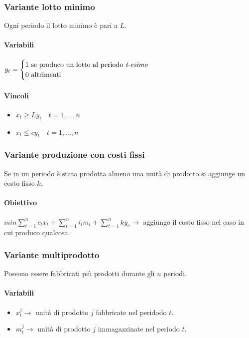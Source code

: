 \documentclass[12pt, twoside, letterpaper]{article}
\newcommand{\casi}[3]{
	$#1 = \begin{cases} \text{#2} \\ \text{#3} \end{cases}$
}
\begin{document}
			\subsubsection{Variante lotto minimo}
				Ogni periodo il lotto minimo è pari a $L$.
				\paragraph{Variabili} \casi{y_t}{1 se produco un lotto al periodo \textit{t-esimo}}{0 altrimenti}
				
				\paragraph{Vincoli} 
					\begin{itemize}
						\item $x_t \geq L y_t \quad t=1, \dots, n$
						\item $x_t \leq c y_t \quad t=1, \dots, n$
					\end{itemize}
					
			\subsubsection{Variante produzione con costi fissi}
				Se in un periodo è stata prodotta almeno una unità di prodotto si aggiunge un costo fisso $k$.
				\paragraph{Obiettivo}
					$min \sum_{t=1}^n c_t x_t + \sum_{t=1}^n i_t m_t + \sum_{t=1}^n k y_c \rightarrow$ aggiungo il costo fisso nel caso in cui produco qualcosa.
			
			\subsubsection{Variante multiprodotto}
				Possono essere fabbricati più prodotti durante gli $n$ periodi.
				
				\paragraph{Variabili}
					\begin{itemize}
						\item $x_t^j \rightarrow$ unità di prodotto $j$ fabbricate nel peridodo $t$.
						\item $m_t^j \rightarrow$ unità di prodotto $j$ immagazzinate nel periodo $t$.						
					\end{itemize}
					
\end{document}
